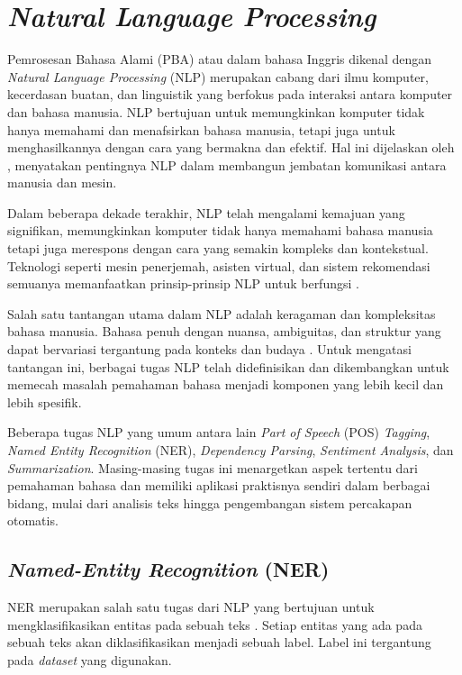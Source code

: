 \section{\textit{Natural Language Processing}}

Pemrosesan Bahasa Alami (PBA) atau dalam bahasa Inggris dikenal dengan \textit{Natural Language Processing} (NLP) merupakan cabang dari ilmu komputer, kecerdasan buatan, dan linguistik yang berfokus pada interaksi antara komputer dan bahasa manusia. NLP bertujuan untuk memungkinkan komputer tidak hanya memahami dan menafsirkan bahasa manusia, tetapi juga untuk menghasilkannya dengan cara yang bermakna dan efektif. Hal ini dijelaskan oleh \citeauthor{nlp} \parencite{nlp}, menyatakan pentingnya NLP dalam membangun jembatan komunikasi antara manusia dan mesin.

Dalam beberapa dekade terakhir, NLP telah mengalami kemajuan yang signifikan, memungkinkan komputer tidak hanya memahami bahasa manusia tetapi juga merespons dengan cara yang semakin kompleks dan kontekstual. Teknologi seperti mesin penerjemah, asisten virtual, dan sistem rekomendasi semuanya memanfaatkan prinsip-prinsip NLP untuk berfungsi \parencite{nlp}.

Salah satu tantangan utama dalam NLP adalah keragaman dan kompleksitas bahasa manusia. Bahasa penuh dengan nuansa, ambiguitas, dan struktur yang dapat bervariasi tergantung pada konteks dan budaya \parencite{ai}. Untuk mengatasi tantangan ini, berbagai tugas NLP telah didefinisikan dan dikembangkan untuk memecah masalah pemahaman bahasa menjadi komponen yang lebih kecil dan lebih spesifik.

Beberapa tugas NLP yang umum antara lain \textit{Part of Speech} (POS) \textit{Tagging}, \textit{Named Entity Recognition} (NER), \textit{Dependency Parsing}, \textit{Sentiment Analysis}, dan \textit{Summarization}. Masing-masing tugas ini menargetkan aspek tertentu dari pemahaman bahasa dan memiliki aplikasi praktisnya sendiri dalam berbagai bidang, mulai dari analisis teks hingga pengembangan sistem percakapan otomatis.

\subsection{\textit{Named-Entity Recognition} (NER)}

NER merupakan salah satu tugas dari NLP yang bertujuan untuk mengklasifikasikan entitas pada sebuah teks \parencite{ner}. Setiap entitas yang ada pada sebuah teks akan diklasifikasikan menjadi sebuah label. Label ini tergantung pada \textit{dataset} yang digunakan.

